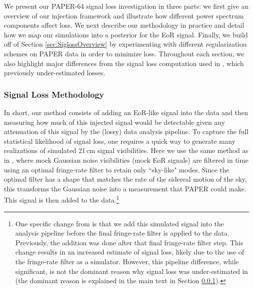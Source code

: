 \documentclass[preprint2,numberedappendix,tighten]{aastex6}  %
\begin{document}
We present our PAPER-64 signal loss investigation in three parts: we first give an overview of our injection framework and illustrate how different power spectrum components affect loss. We next describe our methodology in practice and detail how we map our simulations into a posterior for the EoR signal. Finally, we build off of Section \ref{sec:SiglossOverview} by experimenting with different regularization schemes on PAPER data in order to minimize loss. Throughout each section, we also highlight major differences from the signal loss computation used in , which previously under-estimated losses.


\subsubsection{Signal Loss Methodology} 
\label{sec:siglossmethod}
In short, our method consists of adding an EoR-like signal into the data and then measuring how much of this injected signal would be detectable given any attenuation of this signal by the (lossy) data analysis pipeline.  To capture the full statistical likelihood of signal loss, one requires a quick way to generate many realizations of simulated 21\,cm signal visibilities. Here we use the same method as in , where mock Gaussian noise visibilities (mock EoR signals) 
are filtered in time using an optimal fringe-rate filter to retain only ``sky-like" modes. Since the optimal filter has a shape that matches the rate of the sidereal motion of the sky, this transforms the Gaussian noise into a measurement that PAPER could make. This signal is then added to the data.\footnote{One 
specific change from  is that we add this simulated signal into the analysis pipeline before the final fringe-rate filter is 
applied to the data. Previously, the addition was done after that final fringe-rate filter step.  This change results in an increased 
estimate of signal loss, %
likely due to the use of the fringe-rate filter as a simulator. However, this pipeline difference, while significant, is not the dominant reason why signal loss was under-estimated in  (the dominant reason is explained in the main text in Section \ref{sec:siglossmethod}).}
\end{document}
